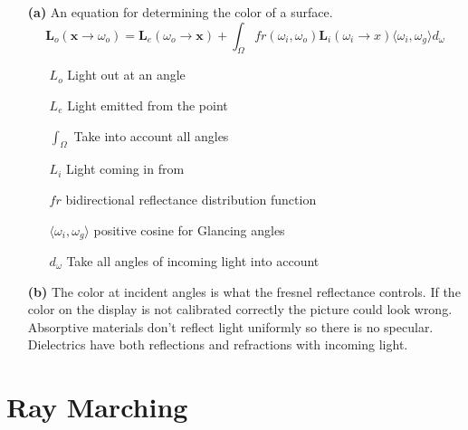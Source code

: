 \documentclass{article}
\begin{document}
\begin{itemize}
    \item[\textbf{(a)}] An equation for determining the color of a surface.
$$
    \mathbf{L}_o(\mathbf{x} \rightarrow{} \omega{}_o) =
    \mathbf{L}_e(\omega{}_o \rightarrow{} \mathbf{x}) +
    \int_{\Omega{}}^{} fr (\omega{}_i, \omega{}_o)
    \mathbf{L}_i (\omega{}_i \rightarrow{} x)
    \langle{}\omega{}_i, \omega{}_g\rangle{}
    d_\omega{}
$$

\begin{itemize}
    \item[$L_o$] Light out at an angle
    \item[$L_e$] Light emitted from the point
    \item[$\int_{\Omega{}}^{}$] Take into account all angles
    \item[$L_i$] Light coming in from
    \item[$fr$] bidirectional reflectance distribution function
    \item[$ \langle{}\omega{}_i, \omega{}_g\rangle{} $] positive cosine for Glancing angles
    \item[$ d_\omega{} $] Take all angles of incoming light into account
\end{itemize}

\item[\textbf{(b)}] The color at incident angles is what the fresnel reflectance controls. If the
    color on the display is not calibrated correctly the picture could look wrong. Absorptive materials
    don't reflect light uniformly so there is no specular. Dielectrics have both reflections and
    refractions with incoming light.

\end{itemize}

\section{Ray Marching}
\end{document}
